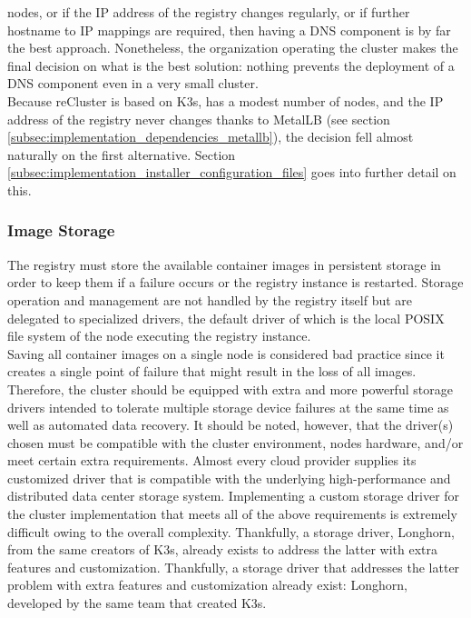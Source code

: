 nodes, or if the IP address of the registry changes regularly, or if further hostname
to IP mappings are required, then having a DNS component is by far the best
approach. Nonetheless, the organization operating the cluster makes the final
decision on what is the best solution: nothing prevents the deployment of a DNS component
even in a very small cluster. \\ %
Because reCluster is based on K3s, has a modest number of nodes, and the IP address
of the registry never changes thanks to MetalLB (see section
\ref{subsec:implementation_dependencies_metallb}), the decision fell almost
naturally on the first alternative. Section \ref{subsec:implementation_installer_configuration_files}
goes into further detail on this.

\subsubsection{Image Storage}
\label{subsubsec:implementation_dependencies_docker_registry_image_storage}

The registry must store the available container images in persistent storage in
order to keep them if a failure occurs or the registry instance is restarted. Storage
operation and management are not handled by the registry itself but are delegated
to specialized drivers, the default driver of which is the local POSIX file
system of the node executing the registry instance\cite{docker_registry_about}.
\\ %
Saving all container images on a single node is considered bad practice since it
creates a single point of failure that might result in the loss of all images.
Therefore, the cluster should be equipped with extra and more powerful storage drivers
intended to tolerate multiple storage device failures at the same time as well as
automated data recovery. It should be noted, however, that the driver(s) chosen must
be compatible with the cluster environment, nodes hardware, and/or meet certain extra
requirements. Almost every cloud provider supplies its customized driver that is
compatible with the underlying high-performance and distributed data center
storage system. Implementing a custom storage driver for the cluster implementation
that meets all of the above requirements is extremely difficult owing to the overall
complexity. Thankfully, a storage driver, Longhorn, from the same creators of K3s,
already exists to address the latter with extra features and customization. Thankfully,
a storage driver that addresses the latter problem with extra features and
customization already exist: Longhorn, developed by the same team that created
K3s.

